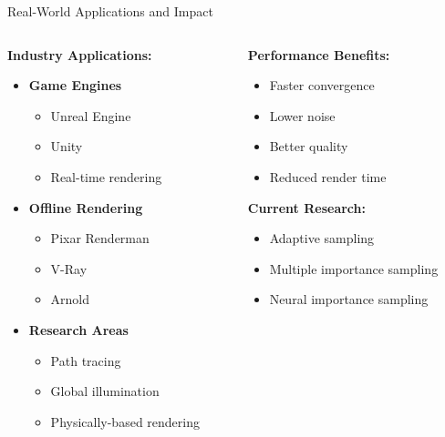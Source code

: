 \documentclass[aspectratio=169]{beamer}
\begin{document}
\begin{frame}{Real-World Applications and Impact}
    \begin{columns}
        \begin{column}{0.6\textwidth}
            \textbf{Industry Applications:}
            \begin{itemize}
                \item<1-> \textbf{Game Engines}
                \begin{itemize}
                    \item Unreal Engine
                    \item Unity
                    \item Real-time rendering
                \end{itemize}
                \item<2-> \textbf{Offline Rendering}
                \begin{itemize}
                    \item Pixar Renderman
                    \item V-Ray
                    \item Arnold
                \end{itemize}
                \item<3-> \textbf{Research Areas}
                \begin{itemize}
                    \item Path tracing
                    \item Global illumination
                    \item Physically-based rendering
                \end{itemize}
            \end{itemize}
        \end{column}
        \begin{column}{0.4\textwidth}
            \textbf{Performance Benefits:}
            \begin{itemize}
                \item Faster convergence
                \item Lower noise
                \item Better quality
                \item Reduced render time
            \end{itemize}
            
            \vspace{0.5cm}
            \textbf{Current Research:}
            \begin{itemize}
                \item Adaptive sampling
                \item Multiple importance sampling
                \item Neural importance sampling
            \end{itemize}
        \end{column}
    \end{columns}
    

\end{frame}
\end{document}
